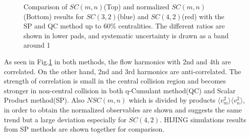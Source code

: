 \begin{figure}[bp]
\begin{center}
        \caption{Comparison of $SC(m,n)$(Top) and normalized $SC(m,n)$(Bottom) results for $SC(3,2)$(blue) and $SC(4,2)$(red) with the SP and QC method up to 60\% centralities. The different ratios are shown in lower pads, and systematic uncertainty is drawn as a band around 1}
        \label{SC_compare}
        \end{center}   
     \end{figure}


As seen in Fig.\ref{SC_compare} in both methods, the flow harmonics with 2nd and 4th are correlated. On the other hand, 2nd and 3rd harmonics are anti-correlated. The strength of correlation is small in the central collision region and becomes stronger in non-central collision in both q-Cumulant method(QC) and Scalar Product method(SP). Also  $NSC(m,n)$ which is divided by products $\langle v_m^2 \rangle \langle  v_n^2\rangle$, in order to obtain the normalized observables are shown and suggests the same trend but a large deviation especially for $SC(4,2)$. HIJING simulations results from SP methods are shown together for comparison. 

